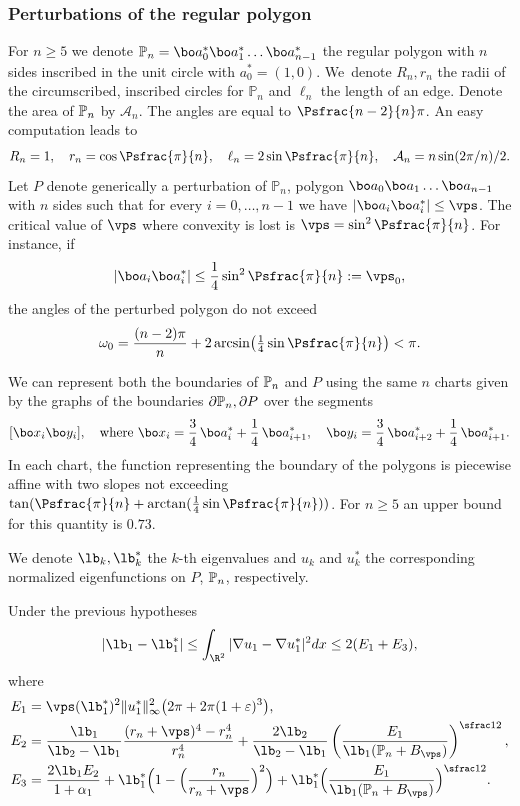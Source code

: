 \subsubsection*{Perturbations of the regular polygon}
For $n \ge 5$ we denote $\mathbb P_n=\bo a_0^* \bo a_1^* \dots \bo a_{n-1}^*$ the regular polygon with $n$ sides inscribed in the unit circle with $a_0^*=(1,0)$. We~denote $R_n, r_n$ the radii of the circumscribed, inscribed circles for $\mathbb P_n$ and $\ell_n$ the length of an edge. Denote the area of $\Bbb P_n$ by $\mathcal A_n$. The angles are equal to $\Psfrac{n-2}{n}\pi$.
An easy computation leads to
\[
R_n=1,\quad r_n = \cos \Psfrac{\pi}{n},\quad  \ell_n = 2 \sin \Psfrac{\pi}{n},\quad  \mathcal A_n = n\sin (2\pi/n)/2.
\]
Let $P$ denote generically a perturbation of $\mathbb P_n$, \ie polygon $\bo a_0 \bo a_1\dots \bo a_{n-1}$ with $n$ sides such that for every $i=0, \dots, n-1$ we have $|\bo a_i\bo a^*_i|\le \vps$. The critical value of $\vps$ where convexity is lost is $\vps= \sin^2 \Psfrac {\pi}{n}$. For instance, if
\[
|\bo a_i\bo a_i^*|\le \frac 14 \sin^2 \Psfrac{\pi}{n}:= \vps_0,
\]
the angles of the perturbed polygon do not exceed
\[
\omega_{0} = \frac{(n-2)\pi}{n} +2 \arcsin \bigl(\tfrac 14 \sin \Psfrac{\pi}{n}\bigr)<\pi.
\]

We can represent both the boundaries of $\Bbb P_n$ and $P$ using the same $n$ charts given by the graphs of the boundaries $\partial \Bbb P_n, \partial P$ over the segments
\[
[\bo x_i \bo y_{i}],\quad\text{where } \bo x_i = \frac 34\, \bo a_i^*+\frac 14\, \bo a_{i+1}^*,\quad \bo y_i= \frac 34\, \bo a_{i+2}^*+\frac 14\, \bo a_{i+1}^*.
\]
In each chart, the function representing the boundary of the polygons is piecewise affine with two slopes not exceeding $\tan (\Psfrac{\pi}{n}+ \arctan (\frac 14 \sin \Psfrac{\pi}{n}))$. For $n \ge 5$ an upper bound for this quantity is $ 0.73 $.

We denote $\lb_k, \lb_k^*$ the $k$-th eigenvalues and $u_k$ and $u_k^*$ the corresponding normalized eigenfunctions on $P$, $\Bbb P_n$, respectively.
\begin{propo}\label{bb03}
Under the previous hypotheses
\begin{equation}\label{bb04}
|\lb_1 -\lb_1^*|\le \int_{\R^2} |\nabla u_1 -\nabla u_1^* |^2 dx \le 2(E_1+E_3),
\end{equation}
where
\begin{align*}
E_1 &= \vps (\lb_1^*)^2 \|u_1^*\|_\infty^2 \big (2\pi+2\pi(1+\varepsilon)^3
\big),
\\
E_2&= \frac{\lb_1}{\lb_2-\lb_1}\frac{(r_n+\vps)^4-r_n^4}{r_n^4} + \frac{2\lb_2}{\lb_2-\lb_1}\left (\frac{E_1}{\lb_1(\Bbb P_n+ B_\vps)}\right)^{\sfrac12},
\\
E_3&=\frac{2 \lb_1 E_2}{1+\alpha_1}+\lb_1^*\Bigl(1- \Bigl(\frac{r_n}{r_n+\vps}\Bigr)^2\Bigr)+\lb_1^* \Bigl(\frac{E_1}{\lb_1(\Bbb P_n + B_\vps)}\Bigr)^{\sfrac12}.
\end{align*}
\end{propo}

